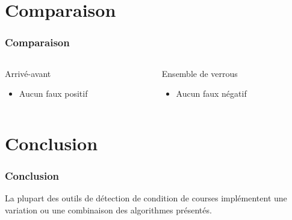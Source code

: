 \documentclass{beamer}
\begin{document}
\section{Comparaison}
\begin{frame}
\frametitle{Comparaison}
\begin{columns}
    \begin{column}{0.5\textwidth}
Arrivé-avant
\begin{itemize}
\item Aucun faux positif
\end{itemize}
    \end{column}
    \begin{column}{0.5\textwidth}
Ensemble de verrous
\begin{itemize}
\item Aucun faux négatif
\end{itemize}
    \end{column}
\end{columns}
\end{frame}

\section{Conclusion}
\begin{frame}
\frametitle{Conclusion}
La plupart des outils de détection de condition de courses implémentent une variation ou une combinaison des algorithmes présentés.
\end{frame}
\end{document}
